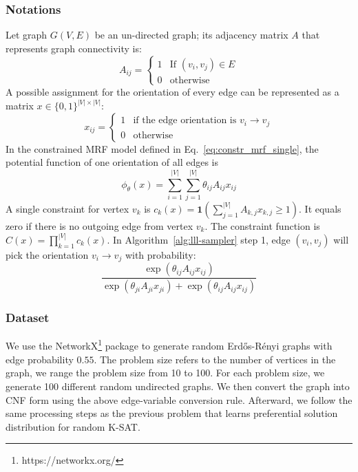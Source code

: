\subsubsection*{Notations} Let graph $G(V,E)$ be an un-directed graph; its adjacency matrix $A$ that
represents graph connectivity is:
\begin{equation}\label{eq:adjacency}
    A_{ij}=\begin{cases}
        {1} & \text{If } (v_i,v_j)\in E \\
        0   & \text{otherwise}
    \end{cases}
\end{equation}
A possible assignment for the orientation of every edge can be represented as a matrix $x\in\{0,1\}^{|V|\times |V|}$:
\begin{equation}\label{eq:orientation-assign}
    x_{ij}=\begin{cases}
        1 & \text{if the edge orientation is } v_i\to v_j \\
        0 & \text{otherwise}
    \end{cases}
\end{equation}
In the constrained MRF model defined in Eq.~\eqref{eq:constr_mrf_single}, the potential function of one orientation of all edges is
\begin{equation*}
    \phi_{\theta}(x)=\sum_{i=1}^{|V|}\sum_{j=1}^{|V|}\theta_{ij}A_{ij}x_{ij}
\end{equation*}
A single constraint for vertex $v_k$ is $c_k(x)=\mathbf{1}\left(\sum_{j=1}^{|V|}A_{k,j}x_{k,j}\ge1\right)$. It equals zero if there is no outgoing edge from vertex $v_k$. The constraint function is $C(x)=\prod_{k=1}^{|V|}c_k(x)$. In Algorithm~\ref{alg:lll-sampler} step 1, edge $(v_i,v_j)$ will pick the orientation $v_i\to v_j$  with probability:
\begin{equation*}
    \frac{\exp(\theta_{ij}A_{ij}x_{ij})}{\exp(\theta_{ji}A_{ji}x_{ji})+\exp(\theta_{ij}A_{ij}x_{ij})}
\end{equation*}

\subsubsection*{Dataset} {We use the NetworkX\footnote{https://networkx.org/} package to generate random Erd\H{o}s-R\'enyi graphs with edge probability $0.55$. The problem size refers to the number of vertices in the graph, we range the problem size from 10 to 100. For each problem size, we generate 100 different random undirected graphs. We then convert the graph into CNF form using the above edge-variable conversion rule. Afterward, we follow the same processing steps as the previous problem that learns preferential solution distribution for random K-SAT. }

